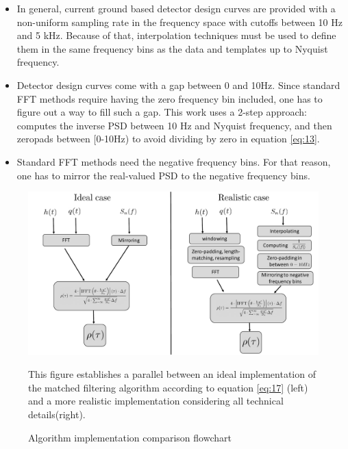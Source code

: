 \begin{itemize}
\begin{itemize}
	\item In general, current ground based detector design curves are provided with a non-uniform sampling rate in the frequency space \cite{Reitze:2019dyk} with cutoffs between 10 Hz and 5 kHz. Because of that, interpolation techniques must be used to define them in the same frequency bins as the data and templates up to Nyquist frequency.
	\item Detector design curves come with a gap between 0 and 10Hz. Since standard FFT methods require having the zero frequency bin included, one has to figure out a way to fill such a gap. This work uses a 2-step approach: computes the inverse PSD between 10 Hz and Nyquist frequency, and then zeropads between [0-10Hz) to avoid dividing by zero in equation \ref{eq:13}.
	\item Standard FFT methods need the negative frequency bins. For that reason, one has to mirror the real-valued PSD to the negative frequency bins.
	\end{itemize}

\end{itemize}

\begin{figure}[hbt!]

\begin{center}

\includegraphics[width=\textwidth, angle=0]{images/comparison.pdf}
\caption{Algorithm implementation comparison flowchart}
\label{fig:8}
\end{center}
This figure establishes a parallel between an ideal implementation of the matched filtering algorithm according to equation \ref{eq:17} (left) and a more realistic implementation considering all technical details(right).
\end{figure}

\FloatBarrier













